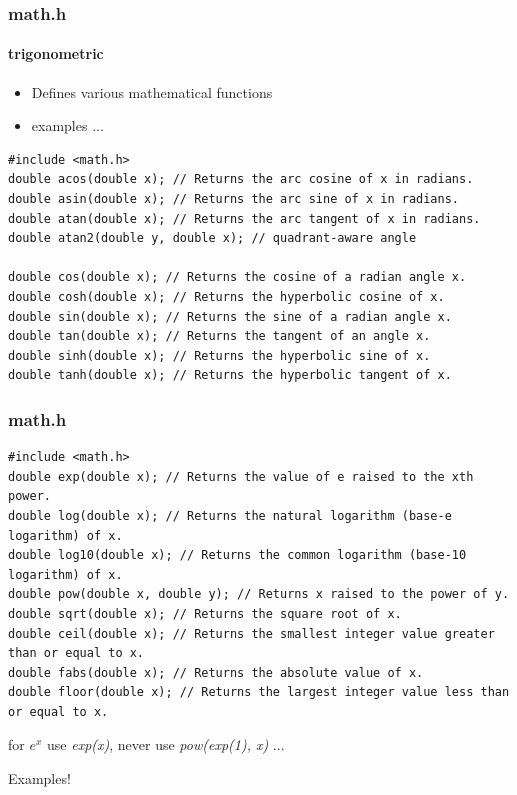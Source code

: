 \documentclass[10pt]{beamer}
\begin{document}
\begin{frame}[fragile]
  \frametitle{math.h}
  \framesubtitle{trigonometric}
  \begin{itemize}
  \item Defines various mathematical functions
  \item examples ...
  \end{itemize}

\begin{lstlisting}
#include <math.h>
double acos(double x); // Returns the arc cosine of x in radians.
double asin(double x); // Returns the arc sine of x in radians.
double atan(double x); // Returns the arc tangent of x in radians.
double atan2(double y, double x); // quadrant-aware angle

double cos(double x); // Returns the cosine of a radian angle x.
double cosh(double x); // Returns the hyperbolic cosine of x.
double sin(double x); // Returns the sine of a radian angle x.
double tan(double x); // Returns the tangent of an angle x.
double sinh(double x); // Returns the hyperbolic sine of x.
double tanh(double x); // Returns the hyperbolic tangent of x.
\end{lstlisting}

\end{frame}

\begin{frame}[fragile]
  \frametitle{math.h}

\begin{lstlisting}
#include <math.h>
double exp(double x); // Returns the value of e raised to the xth power.
double log(double x); // Returns the natural logarithm (base-e logarithm) of x.
double log10(double x); // Returns the common logarithm (base-10 logarithm) of x.
double pow(double x, double y); // Returns x raised to the power of y.
double sqrt(double x); // Returns the square root of x.
double ceil(double x); // Returns the smallest integer value greater than or equal to x.
double fabs(double x); // Returns the absolute value of x.
double floor(double x); // Returns the largest integer value less than or equal to x.

\end{lstlisting}

for $e^x$ use \textit{exp(x)}, never use \textit{pow(exp(1), x)} ...

Examples!

\end{frame}
\end{document}
